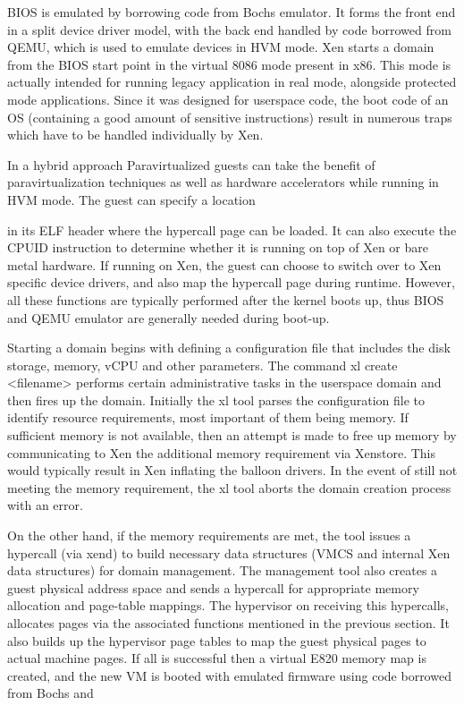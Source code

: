 BIOS is emulated by borrowing code from Bochs emulator. It forms the front end in a split device driver model, with the back end handled by code borrowed from QEMU, which is used to emulate devices in HVM mode. Xen starts a domain from the BIOS start point in the virtual 8086 mode present in x86. This mode is actually intended for running legacy application in real mode, alongside protected mode applications. Since it was designed for userspace code, the boot code of an OS (containing a good amount of sensitive instructions) result in numerous traps which have to be handled individually by Xen.

In a hybrid approach Paravirtualized guests can take the benefit of paravirtualization techniques as well as hardware accelerators while running in HVM mode. The guest can specify a location

in its ELF header where the hypercall page can be loaded. It can also execute the CPUID instruction to determine whether it is running on top of Xen or bare metal hardware. If running on Xen, the guest can choose to switch over to Xen specific device drivers, and also map the hypercall page during runtime. However, all these functions are typically performed after the kernel boots up, thus BIOS and QEMU emulator are generally needed during boot-up.

Starting a domain begins with defining a configuration file that includes the disk storage, memory, vCPU and other parameters. The command xl create <filename> performs certain administrative tasks in the userspace domain and then fires up the domain. Initially the xl tool parses the configuration file to identify resource requirements, most important of them being memory. If sufficient memory is not available, then an attempt is made to free up memory by communicating to Xen the additional memory requirement via Xenstore. This would typically result in Xen inflating the balloon drivers. In the event of still not meeting the memory requirement, the xl tool aborts the domain creation process with an error.

On the other hand, if the memory requirements are met, the tool issues a hypercall (via xend) to build necessary data structures (VMCS and internal Xen data structures) for domain management. The management tool also creates a guest physical address space and sends a hypercall for appropriate memory allocation and page-table mappings. The hypervisor on receiving this hypercalls, allocates pages via the associated functions mentioned in the previous section. It also builds up the hypervisor page tables to map the guest physical pages to actual machine pages. If all is successful then a virtual E820 memory map is created, and the new VM is booted with emulated firmware using code borrowed from Bochs and 

